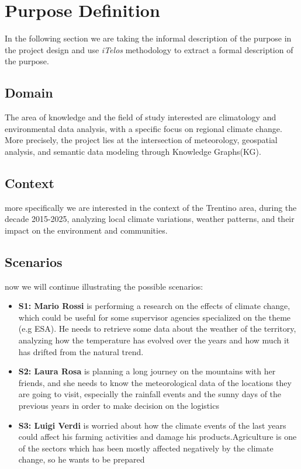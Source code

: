 \section{Purpose Definition}

In the following section we are taking the informal description of the purpose in the project design and use \textit{iTelos}
methodology to extract a formal description of the purpose.

\subsection{Domain}

The area of knowledge and the field of study interested are climatology and environmental data analysis, with a specific
focus on regional climate change. More precisely, the project lies at the intersection of meteorology, geospatial
analysis, and semantic data modeling through Knowledge Graphs(KG).

\subsection{Context}

more specifically we are interested in the context of the Trentino area, during the decade 2015-2025,
analyzing local climate variations, weather patterns, and their impact on the environment and communities.

\subsection{Scenarios}
now we will continue illustrating the possible scenarios:

\begin{itemize}
  \item \textbf{S1: Mario Rossi}  is performing a research on the effects of climate change, which could be useful for some supervisor
                              agencies specialized on the theme (e.g ESA). He needs to retrieve some data about the weather of the territory,
                              analyzing how the temperature has evolved over the years and how much it has drifted from the natural trend.
  \item \textbf{S2: Laura Rosa}  is planning a long journey on the mountains with her friends, and she needs to know the meteorological data of the locations
                             they are going to visit, especially the rainfall events and the sunny days of the previous years in order to make
                             decision on the logistics
  \item \textbf{S3: Luigi Verdi} is worried about how the climate events of the last years could affect his farming activities
                             and damage his products.Agriculture is one of the sectors
                             which has been mostly affected negatively by the climate change, so he wants to be prepared
\end{itemize}

